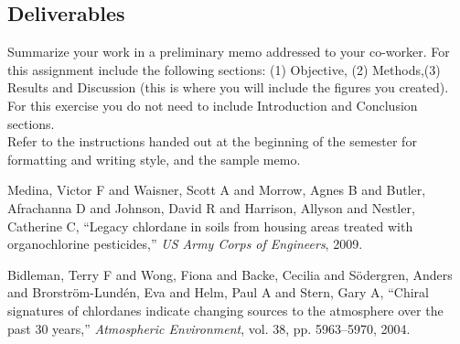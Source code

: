 \documentclass[12pt,letterpaper]{article}
\begin{document}
\subsection *{Deliverables}
Summarize your work in a preliminary memo addressed to your co-worker. For this assignment include the following sections: (1) Objective, (2) Methods,(3) Results and Discussion (this is where you will include the figures you created).  For this exercise you do not need to include Introduction and Conclusion sections.\\

Refer to the instructions handed out at the beginning of the semester for  formatting and writing style, and the sample memo.\\




\begin{thebibliography}{9}



Medina, Victor F and Waisner, Scott A and Morrow, Agnes B and Butler, Afrachanna D and Johnson, David R and Harrison, Allyson and Nestler, Catherine C,
``Legacy chlordane in soils from housing areas treated with organochlorine pesticides,''
\emph{US Army Corps of Engineers}, 2009.


Bidleman, Terry F and Wong, Fiona and Backe, Cecilia and S{\"o}dergren, Anders and Brorstr{\"o}m-Lund{\'e}n, Eva and Helm, Paul A and Stern, Gary A,
``Chiral signatures of chlordanes indicate changing sources to the atmosphere over the past 30 years,''
\emph{Atmospheric Environment}, vol. 38, pp. 5963--5970, 2004.

 

\end{thebibliography}
\pagebreak
\end{document}
